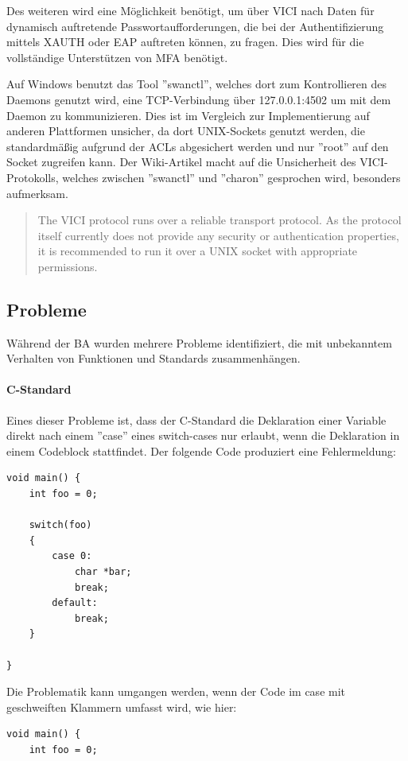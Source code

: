 {Des weiteren wird eine Möglichkeit benötigt, um über \ac{VICI} nach Daten für dynamisch auftretende
Passwortaufforderungen, die bei der Authentifizierung mittels XAUTH oder EAP auftreten können,
zu fragen. Dies wird für die vollständige Unterstützen von \ac{MFA} benötigt.

Auf Windows benutzt das Tool ''swanctl'', welches dort zum Kontrollieren des Daemons
genutzt wird, eine TCP-Verbindung über 127.0.0.1:4502 um mit dem Daemon zu kommunizieren.
Dies ist im Vergleich zur Implementierung auf anderen Plattformen unsicher, da dort
UNIX-Sockets genutzt werden, die standardmäßig aufgrund der \acp{ACL} abgesichert werden
und nur ''root'' auf den Socket zugreifen kann. Der Wiki-Artikel macht auf die Unsicherheit
des \ac{VICI}-Protokolls, welches zwischen ''swanctl'' und ''charon'' gesprochen wird, besonders aufmerksam.
\begin{quote}
The VICI protocol runs over a reliable transport protocol. As the protocol itself currently does not provide any security or authentication properties, it is recommended to run it over a UNIX socket with appropriate permissions.
\end{quote}\cite[][]{_vici_2016}

\subsection{Probleme}
Während der \ac{BA} wurden mehrere Probleme identifiziert, die mit unbekanntem
Verhalten von Funktionen und Standards zusammenhängen.
\paragraph{C-Standard}
Eines dieser Probleme ist, dass der C-Standard die Deklaration einer Variable
direkt nach einem ''case'' eines switch-cases nur erlaubt, wenn die Deklaration
in einem Codeblock stattfindet.
Der folgende Code produziert eine Fehlermeldung:
\begin{lstlisting}[caption=Problematik mit C-Standard,label=c-standard]
void main() {
    int foo = 0;
    
    switch(foo)
    {
        case 0:
            char *bar;
            break;
        default:
            break;
    }

}
\end{lstlisting}
Die Problematik kann umgangen werden, wenn der Code im case mit geschweiften Klammern
umfasst wird, wie hier:
\begin{lstlisting}[caption=Abhilfe für Problematik mit C-Standard,label=c-standard-fix]
void main() {
    int foo = 0;
    

\end{lstlisting}}
